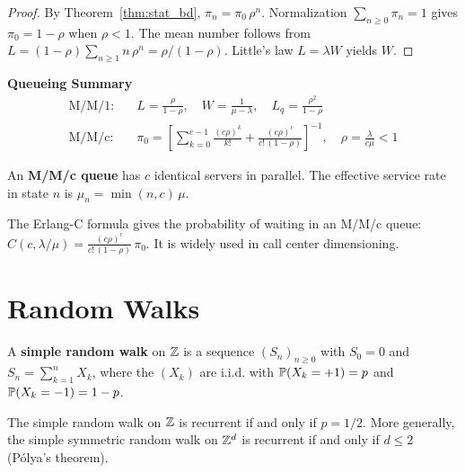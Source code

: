 \begin{proof}
By Theorem~\ref{thm:stat_bd}, $\pi_n = \pi_0\,\rho^n$. Normalization
$\sum_{n \geq 0} \pi_n = 1$ gives $\pi_0 = 1 - \rho$ when $\rho < 1$.
The mean number follows from $L = (1-\rho)\sum_{n \geq 1} n\,\rho^n
= \rho/(1-\rho)$. Little's law $L = \lambda W$ yields $W$.
\end{proof}

\begin{keyformulas}
\textbf{Queueing Summary}
\begin{align*}
  \text{M/M/1:}\quad & L = \frac{\rho}{1-\rho}, \quad
    W = \frac{1}{\mu - \lambda}, \quad
    L_q = \frac{\rho^2}{1-\rho} \\[6pt]
  \text{M/M/c:}\quad & \pi_0 = \left[\sum_{k=0}^{c-1}
    \frac{(c\rho)^k}{k!} + \frac{(c\rho)^c}{c!\,(1-\rho)}\right]^{-1},
    \quad \rho = \frac{\lambda}{c\mu} < 1
\end{align*}
\end{keyformulas}

\begin{definition}[M/M/c Queue]
An \textbf{M/M/c queue} has $c$ identical servers in parallel.
The effective service rate in state $n$ is $\mu_n = \min(n,c)\,\mu$.
\end{definition}

\begin{remark}
The Erlang-C formula gives the probability of
waiting in an M/M/c queue:
$C(c, \lambda/\mu) = \frac{(c\rho)^c}{c!\,(1-\rho)}\,\pi_0$.
It is widely used in call center dimensioning.
\end{remark}

\section{Random Walks}
\label{sec:random_walks}

\begin{definition}
A \textbf{simple random walk} on $\mathbb{Z}$ is a sequence $(S_n)_{n \geq 0}$
with $S_0 = 0$ and $S_n = \sum_{k=1}^n X_k$, where the $(X_k)$ are i.i.d.
with $\mathbb{P}(X_k = +1) = p$ and $\mathbb{P}(X_k = -1) = 1-p$.
\end{definition}

\begin{theorem}
\label{thm:polya}
The simple random walk on $\mathbb{Z}$ is recurrent if and only if $p = 1/2$.
More generally, the simple symmetric random walk on $\mathbb{Z}^d$ is recurrent
if and only if $d \leq 2$ (P\'olya's theorem).
\end{theorem}

